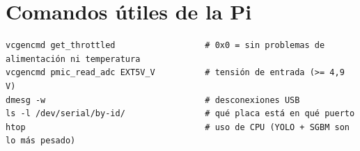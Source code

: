 \section{Comandos útiles de la Pi}

\begin{lstlisting}[language=consola]
vcgencmd get_throttled                  # 0x0 = sin problemas de alimentación ni temperatura
vcgencmd pmic_read_adc EXT5V_V          # tensión de entrada (>= 4,9 V)
dmesg -w                                # desconexiones USB
ls -l /dev/serial/by-id/                # qué placa está en qué puerto
htop                                    # uso de CPU (YOLO + SGBM son lo más pesado)
\end{lstlisting}
